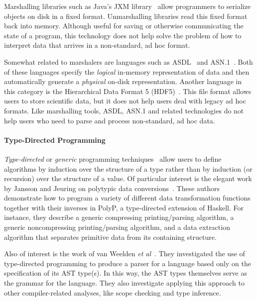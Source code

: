 Marshalling libraries such as Java's JXM library~\cite{jxm} 
allow programmers to
 serialize objects on disk in a fixed format.
Unmarshalling libraries read this fixed format back 
into memory.  Although useful for saving or otherwise communicating 
the state of a program, 
this technology does not help solve the problem of how to interpret
data that arrives in a non-standard, ad hoc format.

Somewhat related to marshalers are languages such as
\textsc{ASDL}~\cite{asdl} and \textsc{ASN.1}~\cite{asn}.  Both of
these languages specify the {\em logical\/} in-memory representation of
data and then automatically generate a {\em physical\/} on-disk
representation.  Another language in this category is the Hierarchical Data
Format 5 (HDF5)~\cite{hdf5}.  This file format allows users to store
scientific data, but it does not help users deal with legacy ad hoc
formats.  Like marshalling tools, ASDL, ASN.1 and related technologies
do not help users who need to parse and process non-standard, ad hoc data.


\paragraph*{Type-Directed Programming}
{\em Type-directed} or
{\em generic} programming techniques~\cite{jansson+:97,jansson+:99,jansson:phdthesis,hinze+:generic-programming,jansson+:02,lammel+:syb} allow users to
define algorithms by induction over the structure of a type rather 
than by induction (or recursion) over the structure of a value.  
Of particular interest is the
elegant work by Jansson and Jeuring on polytypic data 
conversions~\cite{jansson+:97,jansson+:99,jansson:phdthesis,jansson+:02}.
These authors demonstrate how to program a variety of different data 
transformation functions together with their inverses in PolyP, a 
type-directed extension of Haskell. For instance, they describe a 
generic compressing printing/parsing algorithm, a generic 
noncompressing printing/parsing algorithm, and a data
extraction algorithm that separates primitive data from its
containing structure.  

Also of interest is the work of 
van Weelden \textit{et al}~\cite{weelden+:polytypic-ast}.
They investigated the use of
type-directed programming to produce a parser for a language based only on
the specification of its AST type(s). In this way, the AST types
themselves serve as the grammar for the language. They also
investigate applying this approach to other compiler-related analyses,
like scope checking and type inference.

